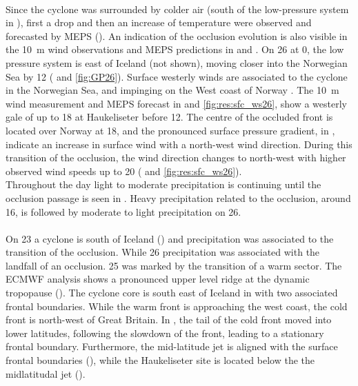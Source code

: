 \\
Since the cyclone was surrounded by colder air (south of the low-pressure system in ), first a drop and then an increase of temperature were observed and forecasted by MEPS (). An indication of the occlusion evolution is also visible in the \SI{10}{\metre} wind observations and MEPS predictions in  and . 
On \SI{26}{\dec} at \SI{0}{\UTC}, the low pressure system is east of Iceland (not shown), moving closer into the Norwegian Sea by \SI{12}{\UTC} ( and \ref{fig:GP26}). 
Surface westerly winds are associated to the cyclone in the Norwegian Sea, and impinging on the West coast of Norway . The \SI{10}{\metre} wind measurement and MEPS forecast in  and \ref{fig:res:sfc_ws26}, show a westerly gale of up to \SI{18}{\mPs} at Haukeliseter before \SI{12}{\UTC}.
The centre of the occluded front is located over Norway at \SI{18}{\UTC}, and the pronounced surface pressure gradient, in , indicate an increase in surface wind with a north-west wind direction. During this transition of the occlusion, the wind direction changes to north-west with higher observed wind speeds up to \SI{20}{\mPs} ( and \ref{fig:res:sfc_ws26}). 
\\
Throughout the day light to moderate precipitation is continuing until the occlusion passage is seen in .
Heavy precipitation related to the occlusion, around \SI{16}{\UTC}, is followed by moderate to light precipitation on \SI{26}{\dec}. 
\\
\\
On \SI{23}{\dec} a cyclone is south of Iceland () and precipitation was associated to the transition of the occlusion. 
While \SI{26}{\dec} precipitation was associated with the landfall of an occlusion. \SI{25}{\dec} was marked by the transition of a warm sector. The ECMWF analysis shows a pronounced upper level ridge at the dynamic tropopause (). The cyclone core is south east of Iceland in  with two associated frontal boundaries. While the warm front is approaching the west coast, the cold front is north-west of Great Britain. In , the tail of the cold front moved into lower latitudes, following the slowdown of the front, leading to a stationary frontal boundary. Furthermore, the mid-latitude jet is aligned with the surface frontal boundaries (), while the Haukeliseter site is located below the the midlatitudal jet (). %
